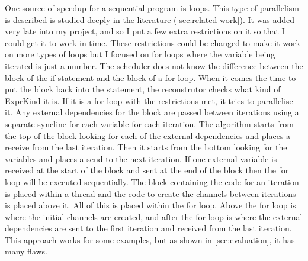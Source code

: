 
One source of speedup for a sequential program is loops. This type of parallelism is described is studied deeply in the literature (\autoref{sec:related-work}). It was added very late into my project, and so I put a few extra restrictions on it so that I could get it to work in time. These restrictions could be changed to make it work on more types of loops but I focused on for loops where the variable being iterated is just a number. The scheduler does not know the difference between the block of the if statement and the block of a for loop. When it comes the time to put the block back into the statement, the reconstrutor checks what kind of ExprKind it is. If it is a for loop with the restrictions met, it tries to parallelise it. Any external dependencies for the block are passed between iterations using a separate syncline for each variable for each iteration. The algorithm starts from the top of the block looking for each of the external dependencies and places a receive from the last iteration. Then it starts from the bottom looking for the variables and places a send to the next iteration. If one external variable is received at the start of the block and sent at the end of the block then the for loop will be executed sequentially. The block containing the code for an iteration is placed within a thread and the code to create the channels between iterations is placed above it. All of this is placed within the for loop. Above the for loop is where the initial channels are created, and after the for loop is where the external dependencies are sent to the first iteration and received from the last iteration. This approach works for some examples, but as shown in \autoref{sec:evaluation}, it has many flaws.

\begin{comment}
\begin{code}
\begin{verbatim}
let a; // Local without init
a = {
    let b = vec![1,2,3]; // Local with init
    println!("{:?}", b); // Mac
    b.len() // Expr
}; // Semi
\end{verbatim}
\caption{Example showing different StmtKinds}
\end{code}
\end{comment}
